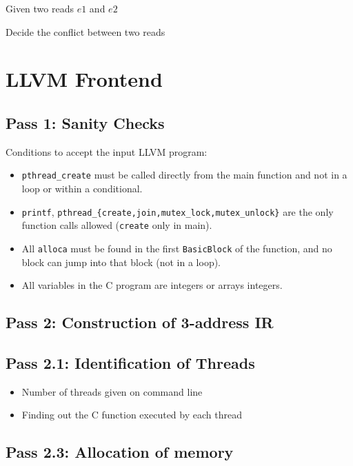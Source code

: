 \documentclass{llncs}
\begin{document}
\begin{algorithm}
Given two reads $e1$ and $e2$
\caption{Decide the conflict between two reads}
\label{a:reads}	
\end{algorithm}

\section{LLVM Frontend}

\subsection*{Pass 1: Sanity Checks}

Conditions to accept the input LLVM program:

\begin{itemize}
\item
  \verb!pthread_create! must be called directly from the main function and not
  in a loop or within a conditional.
\item
  \verb!printf!,
  \verb!pthread_{create,join,mutex_lock,mutex_unlock}! are the only function calls
  allowed (\verb!create! only in main).
\item
  All \verb!alloca! must be found in the first \verb!BasicBlock! of the
  function, and no block can jump into that block (not in a loop).
\item
  All variables in the C program are integers or arrays integers.
\end{itemize}

\subsection*{Pass 2: Construction of 3-address IR}

\subsection*{Pass 2.1: Identification of Threads}

\begin{itemize}
\item Number of threads given on command line
\item Finding out the C function executed by each thread
\end{itemize}

\subsection*{Pass 2.3: Allocation of memory}
\end{document}
